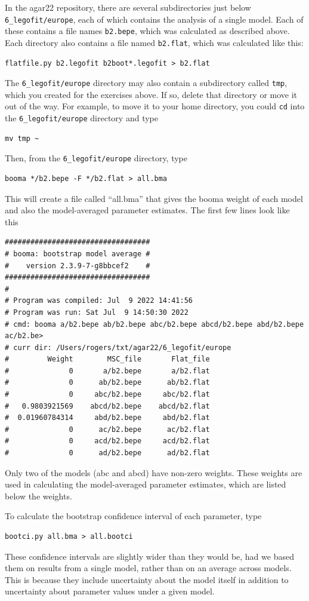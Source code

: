 \documentclass[11pt]{article}
\begin{document}
In the agar22 repository, there are several subdirectories just below
\verb|6_legofit/europe|, each of which contains the analysis of a
single model. Each of these contains a file names \texttt{b2.bepe},
which was calculated as described above. Each directory also contains
a file named \texttt{b2.flat}, which was calculated like this:
\begin{verbatim}
flatfile.py b2.legofit b2boot*.legofit > b2.flat
\end{verbatim}
The \verb|6_legofit/europe| directory may also contain a subdirectory
called \texttt{tmp}, which you created for the exercises above. If so,
delete that directory or move it out of the way. For example, to move
it to your home directory, you could \texttt{cd} into the
\verb|6_legofit/europe| directory and type
\begin{verbatim}
mv tmp ~
\end{verbatim}
Then, from the \verb|6_legofit/europe| directory, type
\begin{verbatim}
booma */b2.bepe -F */b2.flat > all.bma
\end{verbatim}
This will create a file called ``all.bma'' that gives the booma weight
of each model and also the model-averaged parameter estimates. The
first few lines look like this
\begin{verbatim}
##################################
# booma: bootstrap model average #
#    version 2.3.9-7-g8bbcef2    #
##################################
#
# Program was compiled: Jul  9 2022 14:41:56
# Program was run: Sat Jul  9 14:50:30 2022
# cmd: booma a/b2.bepe ab/b2.bepe abc/b2.bepe abcd/b2.bepe abd/b2.bepe ac/b2.be>
# curr dir: /Users/rogers/txt/agar22/6_legofit/europe
#         Weight        MSC_file       Flat_file
#              0       a/b2.bepe       a/b2.flat
#              0      ab/b2.bepe      ab/b2.flat
#              0     abc/b2.bepe     abc/b2.flat
#   0.9803921569    abcd/b2.bepe    abcd/b2.flat
#  0.01960784314     abd/b2.bepe     abd/b2.flat
#              0      ac/b2.bepe      ac/b2.flat
#              0     acd/b2.bepe     acd/b2.flat
#              0      ad/b2.bepe      ad/b2.flat
\end{verbatim}
Only two of the models (abc and abcd) have non-zero weights.  These
weights are used in calculating the model-averaged parameter
estimates, which are listed below the weights.

To calculate the bootstrap confidence interval of each parameter, type
\begin{verbatim}
bootci.py all.bma > all.bootci
\end{verbatim}
These confidence intervals are slightly wider than they would be, had
we based them on results from a single model, rather than on an
average across models. This is because they include uncertainty about
the model itself in addition to uncertainty about parameter values
under a given model.
\end{document}
